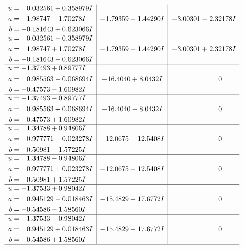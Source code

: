 \documentclass[1p]{elsarticle_modified}
\theoremstyle{definition}
\begin{document}
$$\begin{array}{c|c|c}
\begin{aligned}
u &= \phantom{-}0.032561 + 0.358979 I \\
a &= \phantom{-}1.98747 - 1.70278 I \\
b &= -0.181643 + 0.623066 I\end{aligned}
 & -1.79359 + 1.44290 I & -3.00301 - 2.32178 I \\ \hline\begin{aligned}
u &= \phantom{-}0.032561 - 0.358979 I \\
a &= \phantom{-}1.98747 + 1.70278 I \\
b &= -0.181643 - 0.623066 I\end{aligned}
 & -1.79359 - 1.44290 I & -3.00301 + 2.32178 I \\ \hline\begin{aligned}
u &= -1.37493 + 0.89777 I \\
a &= \phantom{-}0.985563 - 0.068694 I \\
b &= -0.47573 - 1.60982 I\end{aligned}
 & -16.4040 + 8.0432 I & \phantom{-0.000000 } 0 \\ \hline\begin{aligned}
u &= -1.37493 - 0.89777 I \\
a &= \phantom{-}0.985563 + 0.068694 I \\
b &= -0.47573 + 1.60982 I\end{aligned}
 & -16.4040 - 8.0432 I & \phantom{-0.000000 } 0 \\ \hline\begin{aligned}
u &= \phantom{-}1.34788 + 0.94806 I \\
a &= -0.977771 - 0.023278 I \\
b &= \phantom{-}0.50981 - 1.57225 I\end{aligned}
 & -12.0675 - 12.5408 I & \phantom{-0.000000 } 0 \\ \hline\begin{aligned}
u &= \phantom{-}1.34788 - 0.94806 I \\
a &= -0.977771 + 0.023278 I \\
b &= \phantom{-}0.50981 + 1.57225 I\end{aligned}
 & -12.0675 + 12.5408 I & \phantom{-0.000000 } 0 \\ \hline\begin{aligned}
u &= -1.37533 + 0.98042 I \\
a &= \phantom{-}0.945129 - 0.018463 I \\
b &= -0.54586 - 1.58560 I\end{aligned}
 & -15.4829 + 17.6772 I & \phantom{-0.000000 } 0 \\ \hline\begin{aligned}
u &= -1.37533 - 0.98042 I \\
a &= \phantom{-}0.945129 + 0.018463 I \\
b &= -0.54586 + 1.58560 I\end{aligned}
 & -15.4829 - 17.6772 I & \phantom{-0.000000 } 0\\
 \hline 
 \end{array}$$\newpage\newpage\renewcommand{\arraystretch}{1}
\end{document}
